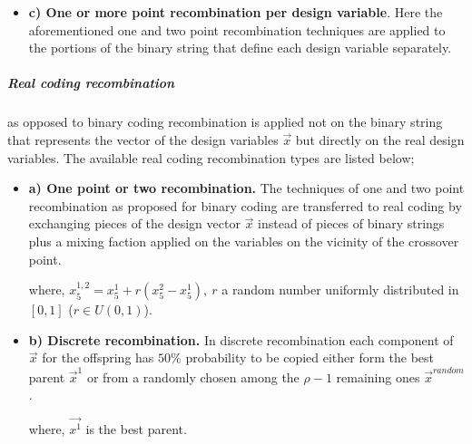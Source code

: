\begin{itemize}
\item[]{\bf c) One or more point recombination per design variable}. Here the aforementioned one and two point recombination techniques are applied to the portions of the binary string that define each design variable separately.  
\end{itemize}
  

\subparagraph{Real coding recombination} as opposed to binary coding recombination is applied not on the binary string that represents the vector of the design variables $\vec{x}$ but directly on the real design variables. The available real coding recombination types are listed below;  

\begin{itemize}
\item[]{\bf a) One point or two recombination.} The techniques of one and two point recombination as proposed for binary coding are transferred to real coding by exchanging  pieces of the design vector $\vec{x}$ instead of pieces of binary strings plus a mixing faction applied on the variables on the vicinity of the crossover point.

\begin{figure}[h!]
\begin{minipage}[b]{1.0\linewidth}
 \centering
\end{minipage}
\label{onepX}
\end{figure}
where, $x_5^{1,2}=x_5^{1}+r(x_5^{2}-x_5^{1}),~ r$ a random number uniformly distributed in $[0,1]$ ($r \in U(0,1)$).    
    
\item[]{\bf b) Discrete recombination.} In discrete recombination each component of $\vec{x}$ for the offspring has $50\%$ probability to be copied either form the best parent $\vec{x}^1$ or from a randomly chosen among the $\rho-1$ remaining ones $\vec{x}^{random}$. 

\begin{figure}[h!]
\begin{minipage}[b]{1.0\linewidth}
 \centering
\end{minipage}
\label{onepX}
\end{figure}
where, $\vec{x^1}$ is the best parent.    
    

\end{itemize}
